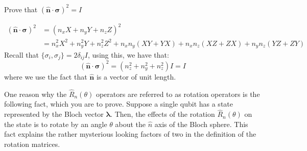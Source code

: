 \begin{example}
    Prove that $(\hat{\mathbf{n}}\cdot \mathbf{\sigma})^2 = I$

    \begin{align*}
    (\hat{\mathbf{n}}\cdot \mathbf{{\sigma}})^2 &= (n_xX+n_yY+n_zZ)^2\\
    &=n_x^2X^2+n_y^2 Y+n_z^2 Z^2 +n_xn_y(XY+YX)+n_xn_z(XZ+ZX)+n_yn_z(YZ+ZY)
    \end{align*}
Recall that $\{\sigma_i,\sigma_j\}=2\delta_{ij}I$, using this, we have that:
\[
(\hat{\mathbf{n}} \cdot \mathbf{\sigma})^2 =(n_z^2 + n_y^2 + n_z^2)I=I
\]
where we use the fact that $\hat{\mathbf{n}}$ is a vector of unit length.
\end{example}

\begin{example}
    One reason why the $\hat{R}_n(\theta)$ operators are referred to as rotation operators is the following fact, which you are to prove. Suppose a single qubit has a state represented by the Bloch vector $\mathbf{\lambda}$. Then, the effects of the rotation $\hat{R}_n(\theta)$ on the state is to rotate by an angle $\theta$ about the $\hat{n}$ axis of the Bloch sphere. This fact explains the rather mysterious looking factors of two in the definition of the rotation matrices.


\end{example}

